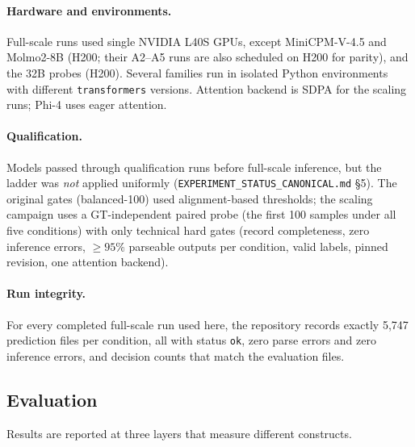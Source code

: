\paragraph{Hardware and environments.} Full-scale runs used single NVIDIA L40S
GPUs, except MiniCPM-V-4.5 and Molmo2-8B (H200; their A2--A5 runs are also
scheduled on H200 for parity), and the 32B probes (H200). Several families run
in isolated Python environments with different \texttt{transformers}
versions. Attention backend is SDPA for the scaling runs; Phi-4 uses eager
attention.

\paragraph{Qualification.} Models passed through qualification runs before
full-scale inference, but the ladder was \emph{not} applied uniformly
(\texttt{EXPERIMENT\_STATUS\_CANONICAL.md} §5). The original gates
(balanced-100) used alignment-based thresholds; the scaling campaign uses a
GT-independent paired probe (the first 100 samples under all five conditions)
with only technical hard gates (record completeness, zero inference errors,
$\geq 95\%$ parseable outputs per condition, valid labels, pinned revision, one
attention backend).

\paragraph{Run integrity.} For every completed full-scale run used here, the
repository records exactly 5{,}747 prediction files per condition, all with
status \texttt{ok}, zero parse errors and zero inference errors, and decision
counts that match the evaluation files.

\subsection{Evaluation}
\label{sec:method:eval}
Results are reported at three layers that measure different constructs.

